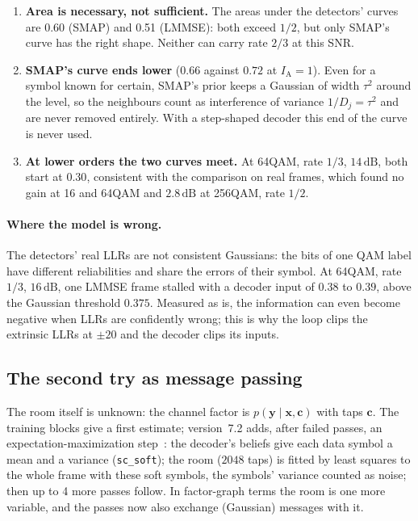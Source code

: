 \documentclass[11pt,a4paper]{article}
\newcommand{\dB}{\,\mathrm{dB}}
\newcommand{\code}[1]{\texttt{#1}}
\newcommand{\IA}{I_{\mathrm{A}}}
\theoremstyle{definition}
\theoremstyle{remark}
\begin{document}
\begin{enumerate}[leftmargin=*]
  \item \textbf{Area is necessary, not sufficient.} The areas under the detectors' curves are 0.60 (SMAP) and 0.51 (LMMSE): both exceed $1/2$, but only SMAP's curve has the right shape. Neither can carry rate $2/3$ at this SNR.
  \item \textbf{SMAP's curve ends lower} ($0.66$ against $0.72$ at $\IA = 1$). Even for a symbol known for certain, SMAP's prior keeps a Gaussian of width $\tau^2$ around the level, so the neighbours count as interference of variance $1/D_j = \tau^2$ and are never removed entirely. With a step-shaped decoder this end of the curve is never used.
  \item \textbf{At lower orders the two curves meet.} At 64QAM, rate $1/3$, $14\dB$, both start at $0.30$, consistent with the comparison on real frames, which found no gain at 16 and 64QAM and $2.8\dB$ at 256QAM, rate $1/2$.
\end{enumerate}

\paragraph{Where the model is wrong.} The detectors' real LLRs are not consistent Gaussians: the bits of one QAM label have different reliabilities and share the errors of their symbol. At 64QAM, rate $1/3$, $16\dB$, one LMMSE frame stalled with a decoder input of $0.38$ to $0.39$, above the Gaussian threshold $0.375$. Measured as is, the information can even become negative when LLRs are confidently wrong; this is why the loop clips the extrinsic LLRs at $\pm20$ and the decoder clips its inputs.

\subsection{The second try as message passing}
\label{sec:secondtry}

The room itself is unknown: the channel factor is $p(\bm{y}\mid\bm{x},\bm{c})$ with taps $\bm{c}$. The training blocks give a first estimate; version~7.2 adds, after failed passes, an expectation-maximization step~\cite{dempster}: the decoder's beliefs give each data symbol a mean and a variance (\code{sc\_soft}); the room ($2048$ taps) is fitted by least squares to the whole frame with these soft symbols, the symbols' variance counted as noise; then up to 4 more passes follow. In factor-graph terms the room is one more variable, and the passes now also exchange (Gaussian) messages with it.
\end{document}
